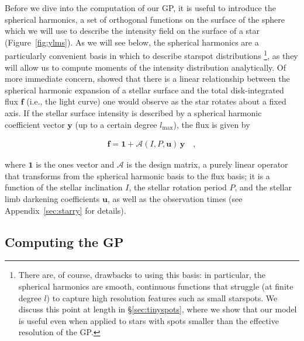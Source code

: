 \documentclass[modern,linenumbers]{aastex62}
\begin{document}
Before we dive into the computation of our GP, it is useful to introduce the spherical harmonics,
a set of orthogonal functions on the surface of the sphere which we will use
to describe the intensity field on the surface of a star
(Figure~\ref{fig:ylms}). As we will see below,
the spherical harmonics are a particularly convenient basis in which to
describe starspot distributions%
\footnote{There are, of course, drawbacks to using this basis:
    in particular, the spherical harmonics are smooth, continuous functions that
    struggle (at finite degree $l$) to capture high resolution features such as
    small starspots. We discuss this point at length in \S\ref{sec:tinyspots},
    where we show that our model is useful even when applied to stars with spots
    smaller than the effective resolution of the GP.}, as they will allow us to compute
moments of the intensity distribution analytically. Of more immediate concern,
\citet{Luger2019} showed that there is a linear relationship between the
spherical harmonic expansion of a stellar surface and the total disk-integrated
flux $\mathbf{f}$ (i.e., the light curve)
one would observe as the star rotates about a fixed axis.
If the stellar surface intensity is described by a spherical harmonic
coefficient vector $\mathbf{y}$ (up to a certain degree $l_\mathrm{max}$),
the flux is given by
%
\begin{linenomath}\begin{align}
        \label{eq:fAy}
        \mathbf{f} = \mathbf{1} + \pmb{\mathcal{A}}(I, P, \mathbf{u}) \, \mathbf{y}
        \quad,
    \end{align}\end{linenomath}
%
where $\mathbf{1}$ is the ones vector and
$\pmb{\mathcal{A}}$ is the \starry
design matrix, a purely linear operator that transforms from the spherical
harmonic basis to the flux basis; it is
a function of the stellar inclination $I$, the stellar
rotation period $P$, and the stellar limb darkening coefficients $\mathbf{u}$,
as well as the observation times (see Appendix~\ref{sec:starry} for details).

\subsection{Computing the GP}
\label{sec:gp-gp}
%
\end{document}
